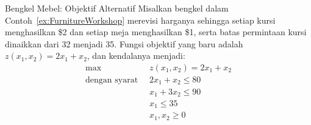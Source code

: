 \begin{example}{Bengkel Mebel: Objektif Alternatif}\label{exa:FurnitureWorkshopAltOpt}
Misalkan bengkel dalam Contoh~\ref{ex:FurnitureWorkshop} merevisi harganya sehingga setiap kursi menghasilkan \$2 dan setiap meja menghasilkan \$1, serta batas permintaan kursi dinaikkan dari 32 menjadi 35. Fungsi objektif yang baru adalah $z(x_1,x_2) = 2x_1 + x_2$, dan kendalanya menjadi:
\begin{equation}
\begin{aligned}
\max\;\;& z(x_1,x_2) = 2x_1 + x_2\\
\text{dengan syarat}\;\;&  2x_1 + x_2 \leq 80\\
& x_1 + 3x_2 \leq 90\\
& x_1 \leq 35\\
& x_1, x_2 \geq 0
\end{aligned}
\label{eqn:FurnitureWorkshopAltOpt}
\end{equation}
\end{example}

